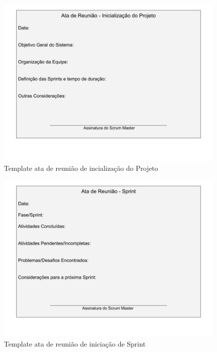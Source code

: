 \documentclass[	DIV=calc,%
							paper=a4,%
							fontsize=12pt,%
							onecolumn]{scrartcl}%
\begin{document}
\begin{figure}
\centering
\includegraphics[width=\textwidth]{iniciacaoProjeto.jpg}
\caption{Template ata de reunião de incialização do Projeto}
\label{templateInicializacao}
\end{figure}
\FloatBarrier

\begin{figure}
\centering
\includegraphics[width=\textwidth]{iniciacaoSprint.jpg}
\caption{Template ata de reunião de iniciação de Sprint}
\label{templateSprint}
\end{figure}
\FloatBarrier
\end{document}
